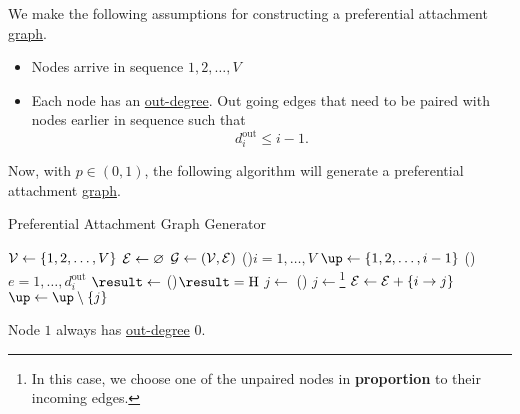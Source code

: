We make the following assumptions for constructing a preferential attachment \hyperref[def:graph]{graph}.
\begin{itemize}
	\item Nodes arrive in sequence \(1, 2, \ldots , V\)
	\item Each node has an \hyperref[def:out-degree]{out-degree}. Out going edges that need to be paired with nodes earlier in sequence such that
	      \[
		      d_{i}^{\text{out}} \leq i - 1.
	      \]
\end{itemize}

Now, with \(p\in(0, 1)\), the following algorithm will generate a preferential attachment \hyperref[def:graph]{graph}.
\par
\begin{algorithm}[H]\label{algo:preferential-attachment-graph-generator-algo}
	\DontPrintSemicolon
	\caption{Preferential Attachment Graph Generator}
	\BlankLine

	\(\mathcal{\MakeUppercase{v}} \gets \{1, 2, \ldots , V\}\)\;
	\(\mathcal{\MakeUppercase{e}} \gets \varnothing\)\;
	\(\mathcal{\MakeUppercase{g}} \gets (\mathcal{\MakeUppercase{v}} , \mathcal{\MakeUppercase{e}} )\) 
	\;
	\For(){\(i = 1, \ldots  , V\) }{
	\(\up\gets \{1, 2, \ldots , i-1 \}\)
	\For(){\(e = 1, \ldots, d^{\text{out}}_i\) }{
	\(\result\gets\) 
	\uIf(){\(\result = \mathrm{H}\) }{
		\(j\gets\)\rand{\(\up\) }
	}\Else(){
	\(j\gets \)\footnote{In this case, we choose one of the unpaired nodes in \textbf{proportion} to their incoming edges.}\;
	}
	\;
	\(\mathcal{\MakeUppercase{e}} \gets \mathcal{\MakeUppercase{e}} + \{i \to j\}\)
	\(\up\gets \up \setminus \{j\}\)
	}
	}

	\;
\end{algorithm}

\begin{remark}
	Node \(1 \) always has \hyperref[def:out-degree]{out-degree} \(0\).
\end{remark}

